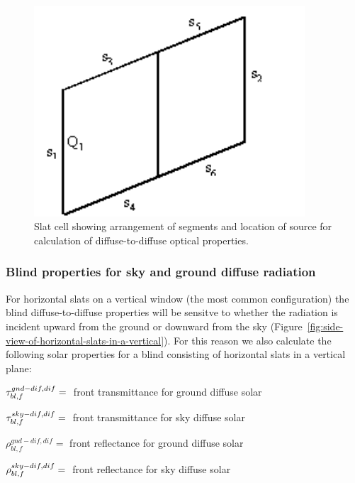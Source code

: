 \begin{figure}[hbtp] %
\centering
\includegraphics[width=0.9\textwidth, height=0.9\textheight, keepaspectratio=true]{media/image1078.png}
\caption{Slat cell showing arrangement of segments and location of source for calculation of diffuse-to-diffuse optical properties. \protect \label{fig:slat-cell-showing-arrangement-of-segments}}
\end{figure}

\subsubsection{Blind properties for sky and ground diffuse radiation}\label{blind-properties-for-sky-and-ground-diffuse-radiation}

For horizontal slats on a vertical window (the most common configuration) the blind diffuse-to-diffuse properties will be sensitve to whether the radiation is incident upward from the ground or downward from the sky (Figure~\ref{fig:side-view-of-horizontal-slats-in-a-vertical}). For this reason we also calculate the following solar properties for a blind consisting of horizontal slats in a vertical plane:

\(\tau_{bl,f}^{gnd - dif,dif} = {\rm{ }}\) front transmittance for ground diffuse solar

\(\tau_{bl,f}^{sky - dif,dif} = {\rm{ }}\) front transmittance for sky diffuse solar

$\rho_{bl,f}^{gnd - dif,dif} = $ front reflectance for ground diffuse solar

\(\rho_{bl,f}^{sky - dif,dif} = {\rm{ }}\) front reflectance for sky diffuse solar

